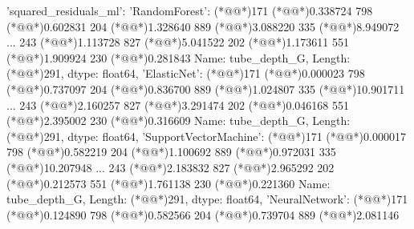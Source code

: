 \documentclass[11pt]{article}
\begin{document}
\begin{codeoutput}
{
    'squared\_residuals\_ml': {'RandomForest': (*@@*)171    (*@@*)0.338724
798    (*@@*)0.602831
204    (*@@*)1.328640
889    (*@@*)3.088220
335    (*@@*)8.949072
         ...   
243    (*@@*)1.113728
827    (*@@*)5.041522
202    (*@@*)1.173611
551    (*@@*)1.909924
230    (*@@*)0.281843
Name: tube\_depth\_G, Length: (*@@*)291, dtype: float64, 'ElasticNet': (*@@*)171     (*@@*)0.000023
798     (*@@*)0.737097
204     (*@@*)0.836700
889     (*@@*)1.024807
335    (*@@*)10.901711
         ...    
243     (*@@*)2.160257
827     (*@@*)3.291474
202     (*@@*)0.046168
551     (*@@*)2.395002
230     (*@@*)0.316609
Name: tube\_depth\_G, Length: (*@@*)291, dtype: float64, 'SupportVectorMachine': (*@@*)171     (*@@*)0.000017
798     (*@@*)0.582219
204     (*@@*)1.100692
889     (*@@*)0.972031
335    (*@@*)10.207948
         ...    
243     (*@@*)2.183832
827     (*@@*)2.965292
202     (*@@*)0.212573
551     (*@@*)1.761138
230     (*@@*)0.221360
Name: tube\_depth\_G, Length: (*@@*)291, dtype: float64, 'NeuralNetwork': (*@@*)171     (*@@*)0.124890
798     (*@@*)0.582566
204     (*@@*)0.739704
889     (*@@*)2.081146
}}
\end{codeoutput}
\end{document}
